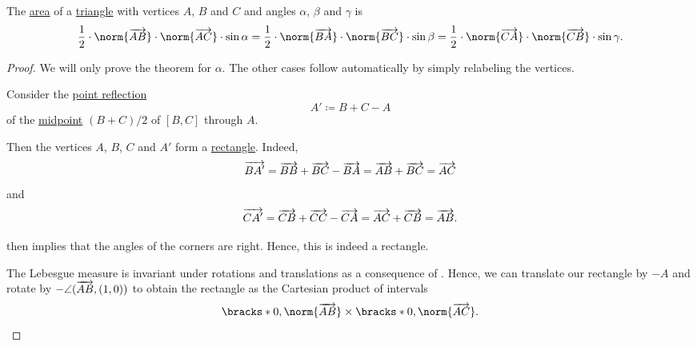\begin{proposition}\label{thm:area_of_triangle}
  The \hyperref[def:figure_area]{area} of a \hyperref[def:triangle]{triangle} with vertices \( A \), \( B \) and \( C \) and angles \( \alpha \), \( \beta \) and \( \gamma \) is
  \begin{equation}\label{eq:thm:area_of_triangle}
    \frac 1 2 \cdot \norm{\vect{AB}} \cdot \norm{\vect{AC}} \cdot \sin \alpha = \frac 1 2 \cdot \norm{\vect{BA}} \cdot \norm{\vect{BC}} \cdot \sin \beta = \frac 1 2 \cdot \norm{\vect{CA}} \cdot \norm{\vect{CB}} \cdot \sin \gamma.
  \end{equation}
\end{proposition}
\begin{proof}
  We will only prove the theorem for \( \alpha \). The other cases follow automatically by simply relabeling the vertices.

   Consider the \hyperref[def:rigid_motion/point_reflection]{point reflection}
  \begin{equation*}
    A' \coloneqq B + C - A
  \end{equation*}
  of the \hyperref[thm:segment_midpoint]{midpoint} \( (B + C) / 2 \) of \( [B, C] \) through \( A \).

  Then the vertices \( A \), \( B \), \( C \) and \( A' \) form a \hyperref[def:parallelogram/rectangle]{rectangle}. Indeed,
  \begin{equation*}
    \overrightarrow{BA'} = \overrightarrow{BB} + \overrightarrow{BC} - \overrightarrow{BA} = \overrightarrow{AB} + \overrightarrow{BC} = \overrightarrow{AC}
  \end{equation*}
  and
  \begin{equation*}
    \overrightarrow{CA'} = \overrightarrow{CB} + \overrightarrow{CC} - \overrightarrow{CA} = \overrightarrow{AC} + \overrightarrow{CB} = \overrightarrow{AB}.
  \end{equation*}

   then implies that the angles of the corners are right. Hence, this is indeed a rectangle.

  The Lebesgue measure is invariant under rotations and translations as a consequence of . Hence, we can translate our rectangle by \( -A \) and rotate by \( -\angle(\overrightarrow{AB}, (1, 0)) \) to obtain the rectangle as the Cartesian product of intervals
  \begin{equation*}
    \bracks*{ 0, \norm{\vect{AB}} } \times \bracks*{ 0, \norm{\vect{AC}} }.
  \end{equation*}


\end{proof}
